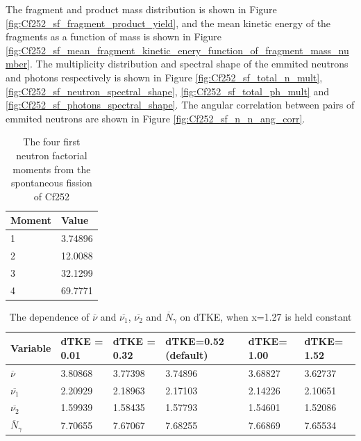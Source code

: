 \documentclass[]{article}
\begin{document}
The fragment and product mass distribution is shown in Figure \ref{fig:Cf252_sf_fragment_product_yield}, and the mean kinetic energy of the fragments as a function of mass is shown in Figure \ref{fig:Cf252_sf_mean_fragment_kinetic_enery_function_of_fragment_mass_number}. The multiplicity distribution and spectral shape of the emmited neutrons and photons respectively is shown in Figure \ref{fig:Cf252_sf_total_n_mult}, \ref{fig:Cf252_sf_neutron_spectral_shape}, \ref{fig:Cf252_sf_total_ph_mult} and \ref{fig:Cf252_sf_photons_spectral_shape}. The angular correlation between pairs of emmited neutrons are shown in Figure \ref{fig:Cf252_sf_n_n_ang_corr}.


\begin{table} [H]
	\centering
	\caption{The four first neutron factorial moments from the spontaneous fission of Cf252}
	\begin{tabularx}{\textwidth}{XX} \hline
		\label{tab:Cf252_n_moments}
		Moment & Value \\ \hline
		1 & 3.74896 \\
		2 & 12.0088\\
		3 & 32.1299\\
		4 & 69.7771\\ 
	\end{tabularx}
\end{table}

\begin{table} [H]
	\centering
	\caption{The dependence of $\overline{\nu}$  and $\overline{\nu_1}$, $\overline{\nu_2}$ and $\overline{N}_{\gamma}$ on dTKE, when x=1.27 is held constant}
	\begin{tabularx}{\textwidth}{XXXXXX} \hline
		\label{tab:dependence_on_dTKE}
		Variable & dTKE = 0.01&dTKE = 0.32 &dTKE=0.52 (default) & dTKE= 1.00 & dTKE= 1.52\\ \hline
		$\overline{\nu}$ & 3.80868 & 3.77398 & 3.74896 & 3.68827 & 3.62737\\
		$\overline{\nu_1}$ & 2.20929 & 2.18963  & 2.17103& 2.14226 & 2.10651 \\
		$\overline{\nu_2}$ & 1.59939 &1.58435 & 1.57793 & 1.54601 &  1.52086\\ 
		$\overline{N}_{\gamma}$ & 7.70655 & 7.67067 & 7.68255 & 7.66869 & 7.65534\\
		\hline
	\end{tabularx}
\end{table}
\end{document}
